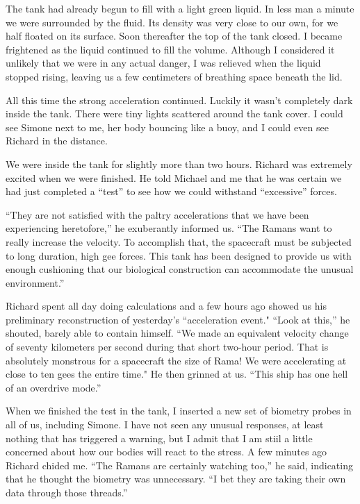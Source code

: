 \documentclass[]{article}
\begin{document}
The tank had already begun to fill with a light green liquid.  In less man a minute we were surrounded by the fluid.  Its density was very close to our own, for we half floated on its surface.  Soon thereafter the top of the tank closed.  I became frightened as the liquid continued to fill the volume.  Although I considered it unlikely that we were in any actual danger, I was relieved when the liquid stopped rising, leaving us a few centimeters of breathing space beneath the lid.

All this time the strong acceleration continued.  Luckily it wasn’t completely dark inside the tank.  There were tiny lights scattered around the tank cover.  I could see Simone next to me, her body bouncing like a buoy, and I could even see Richard in the distance.

We were inside the tank for slightly more than two hours.  Richard was extremely excited when we were finished.  He told Michael and me that he was certain we had just completed a “test” to see how we could withstand “excessive” forces.

“They are not satisfied with the paltry accelerations that we have been experiencing heretofore,” he exuberantly informed us.  “The Ramans want to really increase the velocity.  To accomplish that, the spacecraft must be subjected to long duration, high gee forces.  This tank has been designed to provide us with enough cushioning that our biological construction can accommodate the unusual environment.”

Richard spent all day doing calculations and a few hours ago showed us his preliminary reconstruction of yesterday’s “acceleration event."  “Look at this,” he shouted, barely able to contain himself.  “We made an equivalent velocity change of seventy kilometers per second during that short two-hour period.  That is absolutely monstrous for a spacecraft the size of Rama! We were accelerating at close to ten gees the entire time."  He then grinned at us.  “This ship has one hell of an overdrive mode.”

When we finished the test in the tank, I inserted a new set of biometry probes in all of us, including Simone.  I have not seen any unusual responses, at least nothing that has triggered a warning, but I admit that I am stiil a little concerned about how our bodies will react to the stress.  A few minutes ago Richard chided me.  “The Ramans are certainly watching too,” he said, indicating that he thought the biometry was unnecessary.  “I bet they are taking their own data through those threads.”
\end{document}
